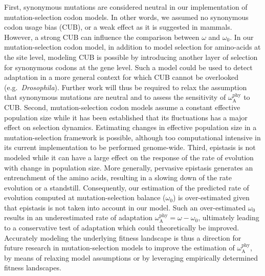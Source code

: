 \documentclass[9pt,twocolumn,twoside,lineno]{pnas-new}
\newcommand{\rateApop}{\omega_{\mathrm{A}}}
\newcommand{\rateAphy}{\rateApop^{\mathrm{phy}}}
\begin{document}
First, synonymous mutations are considered neutral in our implementation of mutation-selection codon models.
In other words, we assumed no synonymous codon usage bias (CUB), or a weak effect as it is suggested in mammals\cite{plotkin_synonymous_2011}.
However, a strong CUB can influence the comparison between $\omega$ and $\omega_0$\cite{spielman_relationship_2015}.
In our mutation-selection codon model, in addition to model selection for amino-acids at the site level, modeling CUB is possible by introducing another layer of selection for synonymous codons at the gene level\cite{yang_mutationselection_2008, rodrigue_mechanistic_2010}.
Such a model could be used to detect adaptation in a more general context for which CUB cannot be overlooked (e.g.~\textit{Drosophila}).
Further work will thus be required to relax the assumption that synonymous mutations are neutral and to assess the sensitivity of $\rateAphy$ to CUB.
Second, mutation-selection codon models assume a constant effective population size while it has been established that its fluctuations has a major effect on selection dynamics\cite{lanfear_population_2014, platt_protein_2018}.
Estimating changes in effective population size in a mutation-selection framework is possible\cite{latrille_inferring_2021}, although too computational intensive in its current implementation to be performed genome-wide.
Third, epistasis is not modeled while it can have a large effect on the response of the rate of evolution with change in population size\cite{latrille_quantifying_2021}.
More generally, pervasive epistasis generates an entrenchment of the amino acids\cite{goldstein_evolutionary_2004, goldstein_nonadaptive_2015, goldstein_sequence_2017}, resulting in a slowing down of the rate evolution\cite{rodrigue_detecting_2017, patel_epistasis_2022} or a standstill\cite{youssef_evolution_2022}.
Consequently, our estimation of the predicted rate of evolution computed at mutation-selection balance ($\omega_0$) is over-estimated given that epistasis is not taken into account in our model.
Such an over-estimated $\omega_0$ results in an underestimated rate of adaptation $\rateAphy = \omega - \omega_0$, ultimately leading to a conservative test of adaptation which could theoretically be improved.
Accurately modeling the underlying fitness landscape is thus a direction for future research in mutation-selection models to improve the estimation of $\rateAphy$, by means of relaxing model assumptions\cite{goldstein_sequence_2017} or by leveraging empirically determined fitness landscapes\cite{bloom_identification_2017, schrempf_scalable_2020}.
\end{document}
